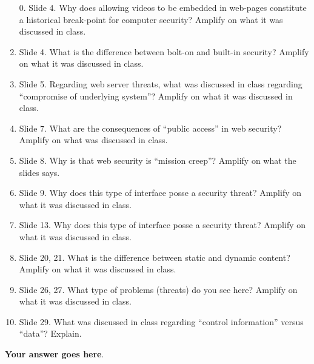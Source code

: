 \documentclass{article}
\begin{document}
\begin{enumerate}
\item[0.] Slide 4. Why does allowing videos to be embedded in
  web-pages constitute a historical break-point for computer security?
  Amplify on what it was discussed in class. 
\item Slide 4. What is the difference between bolt-on and built-in
  security? Amplify on what it was discussed in class.
\item Slide 5. Regarding web server threats, what was discussed in
  class regarding ``compromise of underlying system''? Amplify on what
  it was discussed in class.
\item Slide 7. What are the consequences of ``public access'' in web
  security? Amplify on what was discussed in class.
\item Slide 8. Why is that web security is ``mission creep''? Amplify
  on what the slides says. 
\item Slide 9. Why does this type of interface posse a security
  threat? Amplify on what it was discussed in class. 
\item Slide 13. Why does this type of interface posse a security
  threat? Amplify on what it was discussed in class. 
\item Slide 20, 21. What is the difference between static and dynamic
  content?  Amplify on what it was discussed in class. 
\item Slide 26, 27. What type of problems (threats) do you see here? Amplify on what
  it was discussed in class. 
\item Slide 29. What was discussed in class regarding ``control
  information'' versus ``data''? Explain. 
  
\end{enumerate}

\bigskip

\textbf{Your answer goes here}.
\end{document}
